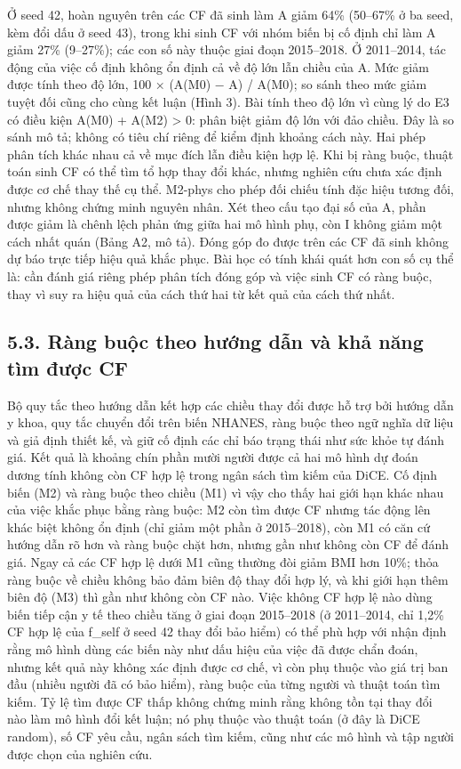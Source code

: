 \documentclass[9pt,a4paper]{extarticle}
\begin{document}
Ở seed 42, hoàn nguyên trên các CF đã sinh làm \textbar A\textbar{} giảm
64\% (50--67\% ở ba seed, kèm đổi dấu ở seed 43), trong khi sinh CF với
nhóm biến bị cố định chỉ làm \textbar A\textbar{} giảm 27\% (9--27\%);
các con số này thuộc giai đoạn 2015--2018. Ở 2011--2014, tác động của
việc cố định không ổn định cả về độ lớn lẫn chiều của A. Mức giảm được
tính theo độ lớn, 100 × (\textbar A(M0)\textbar{} − \textbar A\textbar)
/ \textbar A(M0)\textbar; so sánh theo mức giảm tuyệt đối cũng cho cùng
kết luận (Hình 3). Bài tính theo độ lớn vì cùng lý do E3 có điều kiện
A(M0) + A(M2) \textgreater{} 0: phân biệt giảm độ lớn với đảo chiều. Đây
là so sánh mô tả; không có tiêu chí riêng để kiểm định khoảng cách này.
Hai phép phân tích khác nhau cả về mục đích lẫn điều kiện hợp lệ. Khi bị
ràng buộc, thuật toán sinh CF có thể tìm tổ hợp thay đổi khác, nhưng
nghiên cứu chưa xác định được cơ chế thay thế cụ thể. M2-phys cho phép
đối chiếu tính đặc hiệu tương đối, nhưng không chứng minh nguyên nhân.
Xét theo cấu tạo đại số của A, phần được giảm là chênh lệch phản ứng
giữa hai mô hình phụ, còn I không giảm một cách nhất quán (Bảng A2, mô
tả). Đóng góp đo được trên các CF đã sinh không dự báo trực tiếp hiệu
quả khắc phục. Bài học có tính khái quát hơn con số cụ thể là: cần đánh
giá riêng phép phân tích đóng góp và việc sinh CF có ràng buộc, thay vì
suy ra hiệu quả của cách thứ hai từ kết quả của cách thứ nhất.

\subsection{5.3. Ràng buộc theo hướng dẫn và khả năng tìm được CF}

Bộ quy tắc theo hướng dẫn kết hợp các chiều thay đổi được hỗ trợ bởi
hướng dẫn y khoa, quy tắc chuyển đổi trên biến NHANES, ràng buộc theo
ngữ nghĩa dữ liệu và giả định thiết kế, và giữ cố định các chỉ báo trạng
thái như sức khỏe tự đánh giá. Kết quả là khoảng chín phần mười người
được cả hai mô hình dự đoán dương tính không còn CF hợp lệ trong ngân
sách tìm kiếm của DiCE. Cố định biến (M2) và ràng buộc theo chiều (M1)
vì vậy cho thấy hai giới hạn khác nhau của việc khắc phục bằng ràng
buộc: M2 còn tìm được CF nhưng tác động lên khác biệt không ổn định (chỉ
giảm một phần ở 2015--2018), còn M1 có căn cứ hướng dẫn rõ hơn và ràng
buộc chặt hơn, nhưng gần như không còn CF để đánh giá. Ngay cả các CF
hợp lệ dưới M1 cũng thường đòi giảm BMI hơn 10\%; thỏa ràng buộc về
chiều không bảo đảm biên độ thay đổi hợp lý, và khi giới hạn thêm biên
độ (M3) thì gần như không còn CF nào. Việc không CF hợp lệ nào dùng biến
tiếp cận y tế theo chiều tăng ở giai đoạn 2015--2018 (ở 2011--2014, chỉ
1,2\% CF hợp lệ của f\_self ở seed 42 thay đổi bảo hiểm) có thể phù hợp
với nhận định rằng mô hình dùng các biến này như dấu hiệu của việc đã
được chẩn đoán, nhưng kết quả này không xác định được cơ chế, vì còn phụ
thuộc vào giá trị ban đầu (nhiều người đã có bảo hiểm), ràng buộc của
từng người và thuật toán tìm kiếm. Tỷ lệ tìm được CF thấp không chứng
minh rằng không tồn tại thay đổi nào làm mô hình đổi kết luận; nó phụ
thuộc vào thuật toán (ở đây là DiCE random), số CF yêu cầu, ngân sách
tìm kiếm, cũng như các mô hình và tập người được chọn của nghiên cứu.
\end{document}
